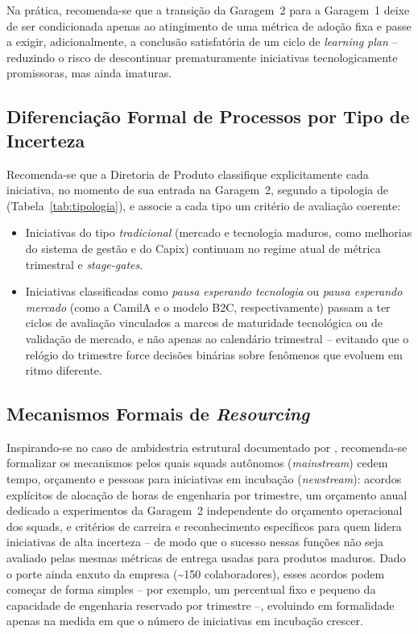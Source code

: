 Na prática, recomenda-se que a transição da Garagem~2 para a Garagem~1 deixe de ser condicionada apenas ao atingimento de uma métrica de adoção fixa e passe a exigir, adicionalmente, a conclusão satisfatória de um ciclo de \textit{learning plan} -- reduzindo o risco de descontinuar prematuramente iniciativas tecnologicamente promissoras, mas ainda imaturas.

\subsection{Diferenciação Formal de Processos por Tipo de Incerteza}

Recomenda-se que a Diretoria de Produto classifique explicitamente cada iniciativa, no momento de sua entrada na Garagem~2, segundo a tipologia de \textcite{salerno2015} (Tabela~\ref{tab:tipologia}), e associe a cada tipo um critério de avaliação coerente:

\begin{itemize}
  \item Iniciativas do tipo \textit{tradicional} (mercado e tecnologia maduros, como melhorias do sistema de gestão e do Capix) continuam no regime atual de métrica trimestral e \textit{stage-gates}.
  \item Iniciativas classificadas como \textit{pausa esperando tecnologia} ou \textit{pausa esperando mercado} (como a CamilA e o modelo B2C, respectivamente) passam a ter ciclos de avaliação vinculados a marcos de maturidade tecnológica ou de validação de mercado, e não apenas ao calendário trimestral -- evitando que o relógio do trimestre force decisões binárias sobre fenômenos que evoluem em ritmo diferente.
\end{itemize}

\subsection{Mecanismos Formais de \textit{Resourcing}}

Inspirando-se no caso de ambidestria estrutural documentado por \textcite{salerno2025}, recomenda-se formalizar os mecanismos pelos quais squads autônomos (\textit{mainstream}) cedem tempo, orçamento e pessoas para iniciativas em incubação (\textit{newstream}): acordos explícitos de alocação de horas de engenharia por trimestre, um orçamento anual dedicado a experimentos da Garagem~2 independente do orçamento operacional dos squads, e critérios de carreira e reconhecimento específicos para quem lidera iniciativas de alta incerteza -- de modo que o sucesso nessas funções não seja avaliado pelas mesmas métricas de entrega usadas para produtos maduros. Dado o porte ainda enxuto da empresa (\textasciitilde150 colaboradores), esses acordos podem começar de forma simples -- por exemplo, um percentual fixo e pequeno da capacidade de engenharia reservado por trimestre --, evoluindo em formalidade apenas na medida em que o número de iniciativas em incubação crescer.

